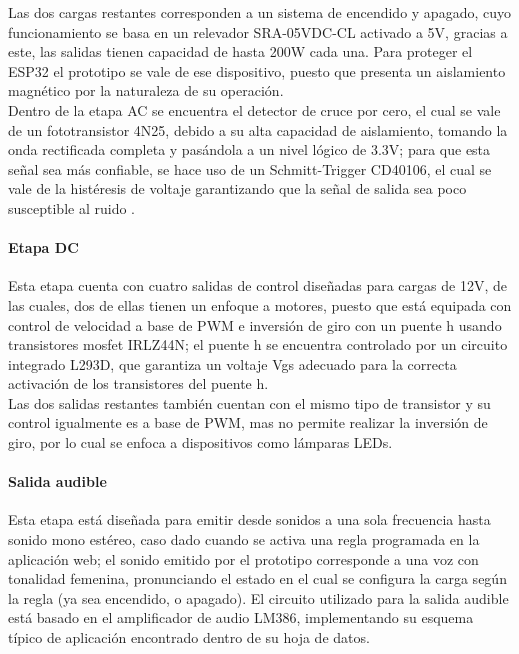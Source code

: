 		Las dos cargas restantes corresponden a un sistema de encendido y apagado, cuyo funcionamiento se basa en un relevador SRA-05VDC-CL activado a 5V, gracias a este, las salidas tienen capacidad de hasta 200W cada una. Para proteger el ESP32 el prototipo se vale de ese dispositivo, puesto que presenta un aislamiento magnético por la naturaleza de su operación.\\
			
		Dentro de la etapa AC se encuentra el detector de cruce por cero, el cual se vale de un fototransistor 4N25, debido a su alta capacidad de aislamiento, tomando la onda rectificada completa y pasándola a un nivel lógico de 3.3V; para que esta señal sea más confiable, se hace uso de un Schmitt-Trigger CD40106, el cual se vale de la histéresis de voltaje garantizando que la señal de salida sea poco susceptible al ruido \cite{DC0}.\\
	
	\paragraph{Etapa DC}
		Esta etapa cuenta con cuatro salidas de control diseñadas para cargas de 12V, de las cuales, dos de ellas tienen un enfoque a motores, puesto que está equipada con control de velocidad a base de PWM e inversión de giro con un puente h usando transistores mosfet IRLZ44N; el puente h se encuentra controlado por un circuito integrado L293D, que garantiza un voltaje Vgs adecuado para la correcta activación de los transistores del puente h.\\
		
		Las dos salidas restantes también cuentan con el mismo tipo de transistor y su control igualmente es a base de PWM, mas no permite realizar la inversión de giro, por lo cual se enfoca a dispositivos como lámparas LEDs.\\
	
	\paragraph{Salida audible}
		Esta etapa está diseñada para emitir desde sonidos a una sola frecuencia hasta sonido mono estéreo, caso dado cuando se activa una regla programada en la aplicación web; el sonido emitido por el prototipo corresponde a una voz con tonalidad femenina, pronunciando el estado en el cual se configura la carga según la regla (ya sea encendido, o apagado). El circuito utilizado para la salida audible está basado en el amplificador de audio LM386, implementando su esquema típico de aplicación encontrado dentro de su hoja de datos.\cite{LM386}\\	
				
